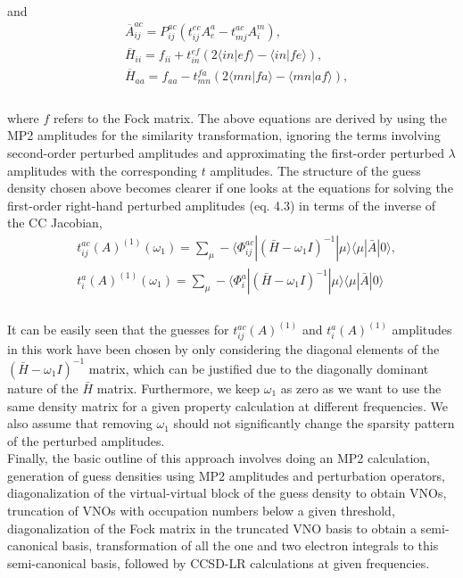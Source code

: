 \\
and %
\begin{equation}
\begin{split}
& \overbar{A}^{ac}_{ij} = P_{ij}^{ac}(t^{ec}_{ij}A^a_e - t^{ac}_{mj}A^m_i) ,\\
& \overbar{H}_{ii} =  f_{ii} + t^{ef}_{in}(2 \langle in|ef \rangle - \langle in|fe \rangle),\\
& \overbar{H}_{aa} =  f_{aa} - t^{fa}_{mn}(2 \langle mn|fa \rangle - \langle mn|af \rangle), \\
\end{split}
\end{equation}
\\
where $f$ refers to the Fock matrix. The above equations are derived by 
using the MP2 amplitudes for the similarity transformation, ignoring the terms 
involving second-order perturbed amplitudes and approximating the first-order 
perturbed $\lambda$ amplitudes with the corresponding $t$ amplitudes. 
The structure of the guess density chosen above becomes clearer 
if one looks at the equations for solving the first-order right-hand perturbed amplitudes 
(eq. 4.3) in terms of the inverse of the CC Jacobian,
\\
\begin{equation}
\begin{split}
& t^{ac}_{ij}(A)^{(1)}(\omega_1) = \sum_\mu - \langle\Phi_{ij}^{ac}| {(\bar{H} -\omega_1 I)}^{-1} |
\mu\rangle\langle \mu| \bar{A} | 0\rangle, \\
& t^{a}_{i}(A)^{(1)}(\omega_1) = \sum_\mu -\langle\Phi_{i}^{a}| {(\bar{H} -\omega_1 I)}^{-1} |
\mu\rangle \langle \mu| \bar{A} | 0\rangle \\
\end{split}
\end{equation}
\\
It can be easily seen that the guesses for $t^{ac}_{ij}(A)^{(1)}$ and 
$t^{a}_{i}(A)^{(1)}$ amplitudes in this work have been chosen by 
only considering the diagonal elements of the $(\bar{H} -\omega_1 I)^{-1}$
matrix, which can be justified due to the diagonally dominant nature of the
$\bar{H}$ matrix. Furthermore, we keep $\omega_1$ as zero as we 
want to use the same density matrix for a given property calculation at different
frequencies. We also assume that removing $\omega_1$ should not significantly change the 
sparsity pattern of the perturbed amplitudes. \\
Finally, the basic outline of this approach
involves doing an MP2 calculation, generation of guess densities using MP2 amplitudes and 
perturbation operators, diagonalization of the virtual-virtual block of the guess density 
to obtain VNOs, truncation of VNOs with occupation numbers below a given threshold, 
diagonalization of the Fock matrix in the truncated VNO basis to obtain a semi-canonical 
basis, transformation of all the one and two electron integrals to this semi-canonical 
basis, followed by CCSD-LR calculations at given frequencies.

